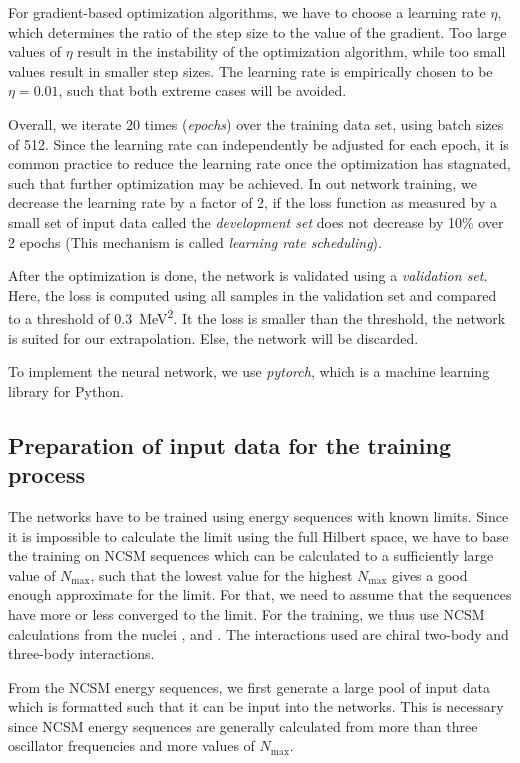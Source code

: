 For gradient-based optimization algorithms, we have to choose a learning rate $\eta$, which determines the ratio of the step size to the value of the gradient. Too large values of $\eta$ result in the instability of the optimization algorithm, while too small values result in smaller step sizes. The learning rate is empirically chosen to be $\eta = 0.01$, such that both extreme cases will be avoided.

Overall, we iterate 20 times (\textit{epochs}) over the training data set, using batch sizes of 512. Since the learning rate can independently be adjusted for each epoch, it is common practice to reduce the learning rate once the optimization has stagnated, such that further optimization may be achieved. In out network training, we decrease the learning rate by a factor of 2, if the loss function as measured by a small set of input data called the \textit{development set} does not decrease by 10\% over 2 epochs (This mechanism is called \textit{learning rate scheduling}).

After the optimization is done, the network is validated using a \textit{validation set}. Here, the loss is computed using all samples in the validation set and compared to a threshold of \SI{0.3}{\mega\electronvolt\squared}. It the loss is smaller than the threshold, the network is suited for our extrapolation. Else, the network will be discarded.

To implement the neural network, we use \textit{pytorch}, which is a machine learning library for Python.

\subsection{Preparation of input data for the training process}
\label{sec:inflate}
The networks have to be trained using energy sequences with known limits. Since it is impossible to calculate the limit using the full Hilbert space, we have to base the training on NCSM sequences which can be calculated to a sufficiently large value of $N_\mathrm{max}$, such that the lowest value for the highest $N_\mathrm{max}$ gives a good enough approximate for the limit. For that, we need to assume that the sequences have more or less converged to the limit. For the training, we thus use NCSM calculations from the nuclei ,  and . The interactions used are chiral two-body and three-body interactions.

From the NCSM energy sequences, we first generate a large pool of input data which is formatted such that it can be input into the networks. This is necessary since NCSM energy sequences are generally calculated from more than three oscillator frequencies and more values of $N_\mathrm{max}$.

